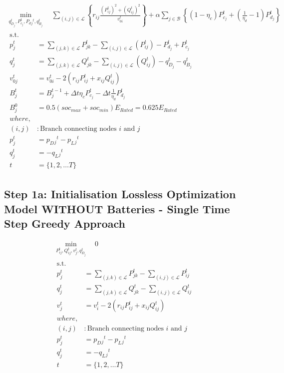 \begin{gather}
    \min_{q_{D_j}^t,
	P_{c_j}^t, P_d{_j}^t, q_{B_j}^t} \quad
	\sum_{(i, j) \in \mathcal{L}} \left\{r_{ij}\frac{(P_{ij}^{t})^2 + (Q_{ij}^{t})^2}{v_{0i}^{t}} \right\} + 
	\alpha \sum_{j \in \mathcal{B}} \left\{(1- \eta_c)P_{c_j}^t + \left( \frac{1}{\eta_d}-1 \right) P_{d_j}^t \right\} \\
	\begin{align}
		\text{s.t.} & {}\nonumber \\
		{p_j^t} & = {\sum_{(j, k) \in \mathcal{L}} P_{jk}^t - \sum_{(i, j) \in \mathcal{L}}\left(P_{ij}^t\right) - P_{d_j}^t + P_{c_j}^t} && \\
		{q_j^t} & = {\sum_{(j, k) \in \mathcal{L}} Q_{jk}^t - \sum_{(i, j) \in \mathcal{L}}\left(Q_{ij}^t\right) - q_{D_j}^t - q_{B_j}^t} && \\
		{v_{0j}^t} & = {v_{0i}^t - 2(r_{ij}P_{ij}^t + x_{ij}Q_{ij}^t)} && \\
		{B_{j}^{t}} &= {B_{j}^{t-1} + \Delta t  \eta_c P_{c_j}^t - \Delta t\frac{1}{\eta_d} P_{d_j}^t} \\
		{ B_{j}^{0} } &= { 0.5(soc_{max}+soc_{min})E_{Rated} = 0.625E_{Rated}} \\
		{where,} & {} \\
		{(i, j)} &: {\text{Branch connecting nodes $i$ and $j$}} \\
		{p_j^t} &= {p_D{_j}^t - p_L{_j}^t} \\
		{q_j^t} &= {-q_L{_j}^t} \\
		{t} &= {\{1, 2, \ldots T\}}
	\end{align}
\end{gather}

\subsection*{Step 1a: Initialisation Lossless Optimization Model WITHOUT Batteries - Single Time Step Greedy Approach}


\begin{gather}
    \min_{P_{ij}^t, Q_{ij}^t, v_{j}^t,  q_{D_j}^t} \quad 0 \\
	\begin{align}
		\text{s.t.} & {}\nonumber \\
		{p_j^t} & = {\sum_{(j, k) \in \mathcal{L}} P_{jk}^t - \sum_{(i, j) \in \mathcal{L}} P_{ij}^t } && \\
		{q_j^t} & = {\sum_{(j, k) \in \mathcal{L}} Q_{jk}^t - \sum_{(i, j) \in \mathcal{L}} Q_{ij}^t } && \\
		{v_j^t} & = {v_{i}^t - 2(r_{ij}P_{ij}^t + x_{ij}Q_{ij}^t)} && \\
		{where,} & {} \\
		{(i, j)} &: {\text{Branch connecting nodes $i$ and $j$}} \\
		{p_j^t} &= {p_D{_j}^t - p_L{_j}^t} \\
		{q_j^t} &= {-q_L{_j}^t} \\
		{t} &= {\{1, 2, \ldots T\}}
	\end{align}
\end{gather}

